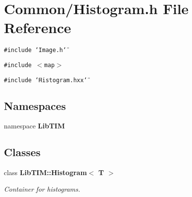 \section{Common/Histogram.h File Reference}
\label{Histogram_8h}
{\tt \#include \char`\"{}Image.h\char`\"{}}\par
{\tt \#include $<$map$>$}\par
{\tt \#include \char`\"{}Histogram.hxx\char`\"{}}\par
\subsection*{Namespaces}
\begin{CompactItemize}
\item 
namespace {\bf Lib\-TIM}
\end{CompactItemize}
\subsection*{Classes}
\begin{CompactItemize}
\item 
class {\bf Lib\-TIM::Histogram$<$ T $>$}
\begin{CompactList}\small\item\em Container for histograms. \item\end{CompactList}\end{CompactItemize}
